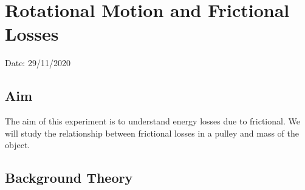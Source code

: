 \chapter{Rotational Motion and Frictional Losses}

Date: 29/11/2020

\section{Aim}

The aim of this experiment is to understand energy losses due to frictional. We will study the relationship between frictional losses in 
a pulley and mass of the object.
    


\section{Background Theory}



